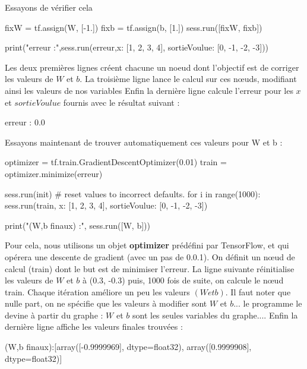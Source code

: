 \documentclass[a4paper,11pt]{book}
\theoremstyle{theo}
\begin{document}
Essayons de vérifier cela 
\begin{mypython}
fixW = tf.assign(W, [-1.])
fixb = tf.assign(b, [1.])
sess.run([fixW, fixb])

print("erreur :",sess.run(erreur,{x: [1, 2, 3, 4], sortieVoulue: [0, -1, -2, -3]}))
\end{mypython}
Les deux premières lignes créent chacune un noeud dont l'objectif est de corriger les valeurs de $W$ et $b$. La troisième ligne lance le calcul sur ces nœuds, modifiant ainsi les valeurs de nos variables
Enfin la dernière ligne calcule l'erreur pour les $x$ et $sortieVoulue$ fournis avec le résultat suivant :
\begin{myoutput}
erreur : 0.0
\end{myoutput}
Essayons maintenant de trouver automatiquement ces valeurs pour W et b :
\begin{mypython}
optimizer = tf.train.GradientDescentOptimizer(0.01)
train = optimizer.minimize(erreur)

sess.run(init) # reset values to incorrect defaults.
for i in range(1000):
  sess.run(train, {x: [1, 2, 3, 4], sortieVoulue: [0, -1, -2, -3]})

print("(W,b finaux) :", sess.run([W, b]))
\end{mypython}
Pour cela, nous utilisons un objet \textbf{optimizer} prédéfini par TensorFlow, et qui opérera une descente de gradient (avec un pas de 0.0.1). On définit un nœud de calcul (train) dont le but est de minimiser  l'erreur.
La ligne suivante réinitialise les valeurs de $W$ et $b$ à (0.3, -0.3)
puis, 1000 fois de suite, on calcule le nœud train. Chaque itération améliore un peu les valeurs $(W et b)$. Il faut noter que nulle part, on ne spécifie que les valeurs à modifier sont $W$ et $b$... le programme le devine à partir du graphe : $W$ et $b$ sont les seules variables du graphe....
Enfin la dernière ligne affiche les valeurs finales trouvées :
\begin{myoutput}
(W,b finaux):[array([-0.9999969], dtype=float32), array([0.9999908], dtype=float32)]
\end{myoutput}
\end{document}
